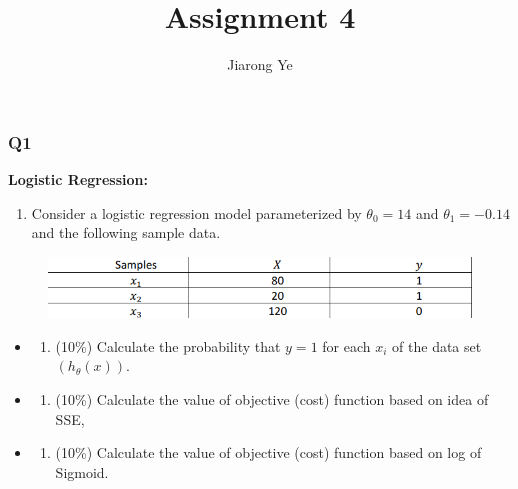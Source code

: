 \documentclass[11pt]{article}
\title{Assignment 4}
\author{Jiarong Ye}
\makeatletter
\def\maxwidth{\ifdim\Gin@nat@width>\linewidth\linewidth
    \else\Gin@nat@width\fi}
\let\Oldincludegraphics\includegraphics
\renewcommand{\includegraphics}[1]{\Oldincludegraphics[width=.8\maxwidth]{#1}}
\providecommand{\tightlist}{%
      \setlength{\itemsep}{0pt}\setlength{\parskip}{0pt}}
\makeatother
\begin{document}
    
    
    \maketitle
    
    

    
    \subsubsection*{Q1}\label{q1}

    \textbf{Logistic Regression:}

\begin{enumerate}
\def\labelenumi{\arabic{enumi}.}
\tightlist
\item
  Consider a logistic regression model parameterized by \(\theta_0= 14\)
  and \(\theta_1= -0.14\) and the following sample data.
\end{enumerate}

\begin{figure}[H]
\centering
\includegraphics{1.png}
\caption{}
\end{figure}

\begin{itemize}
\item
  \begin{enumerate}
  \def\labelenumi{\alph{enumi})}
  \tightlist
  \item
    (10\%) Calculate the probability that \(y = 1\) for each \(x_i\) of
    the data set \((ℎ_{\theta }(x))\).
  \end{enumerate}
\item
  \begin{enumerate}
  \def\labelenumi{\alph{enumi})}
  \setcounter{enumi}{1}
  \tightlist
  \item
    (10\%) Calculate the value of objective (cost) function based on
    idea of SSE,
  \end{enumerate}
\item
  \begin{enumerate}
  \def\labelenumi{\alph{enumi})}
  \setcounter{enumi}{2}
  \tightlist
  \item
    (10\%) Calculate the value of objective (cost) function based on log
    of Sigmoid.
  \end{enumerate}
\end{itemize}
\end{document}
